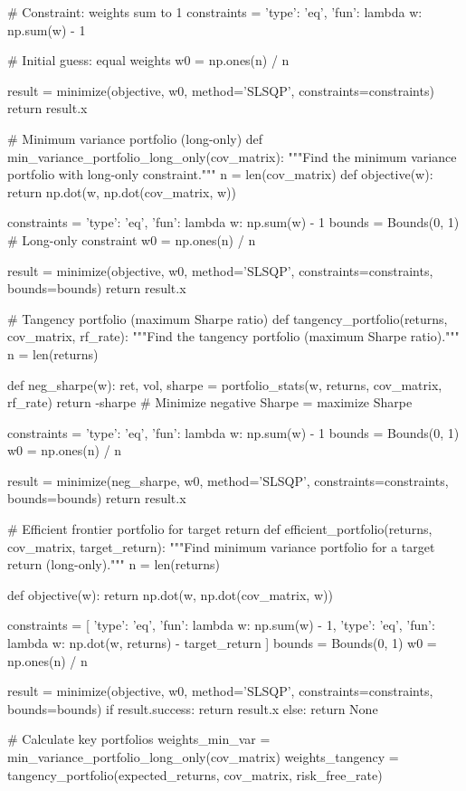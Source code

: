 \documentclass[a4paper, 11pt]{article}
\begin{document}
\begin{pycode}
    # Constraint: weights sum to 1
    constraints = {'type': 'eq', 'fun': lambda w: np.sum(w) - 1}

    # Initial guess: equal weights
    w0 = np.ones(n) / n

    result = minimize(objective, w0, method='SLSQP', constraints=constraints)
    return result.x

# Minimum variance portfolio (long-only)
def min_variance_portfolio_long_only(cov_matrix):
    """Find the minimum variance portfolio with long-only constraint."""
    n = len(cov_matrix)
    def objective(w):
        return np.dot(w, np.dot(cov_matrix, w))

    constraints = {'type': 'eq', 'fun': lambda w: np.sum(w) - 1}
    bounds = Bounds(0, 1)  # Long-only constraint
    w0 = np.ones(n) / n

    result = minimize(objective, w0, method='SLSQP', constraints=constraints, bounds=bounds)
    return result.x

# Tangency portfolio (maximum Sharpe ratio)
def tangency_portfolio(returns, cov_matrix, rf_rate):
    """Find the tangency portfolio (maximum Sharpe ratio)."""
    n = len(returns)

    def neg_sharpe(w):
        ret, vol, sharpe = portfolio_stats(w, returns, cov_matrix, rf_rate)
        return -sharpe  # Minimize negative Sharpe = maximize Sharpe

    constraints = {'type': 'eq', 'fun': lambda w: np.sum(w) - 1}
    bounds = Bounds(0, 1)
    w0 = np.ones(n) / n

    result = minimize(neg_sharpe, w0, method='SLSQP', constraints=constraints, bounds=bounds)
    return result.x

# Efficient frontier portfolio for target return
def efficient_portfolio(returns, cov_matrix, target_return):
    """Find minimum variance portfolio for a target return (long-only)."""
    n = len(returns)

    def objective(w):
        return np.dot(w, np.dot(cov_matrix, w))

    constraints = [
        {'type': 'eq', 'fun': lambda w: np.sum(w) - 1},
        {'type': 'eq', 'fun': lambda w: np.dot(w, returns) - target_return}
    ]
    bounds = Bounds(0, 1)
    w0 = np.ones(n) / n

    result = minimize(objective, w0, method='SLSQP', constraints=constraints, bounds=bounds)
    if result.success:
        return result.x
    else:
        return None

# Calculate key portfolios
weights_min_var = min_variance_portfolio_long_only(cov_matrix)
weights_tangency = tangency_portfolio(expected_returns, cov_matrix, risk_free_rate)


\end{pycode}
\end{document}
